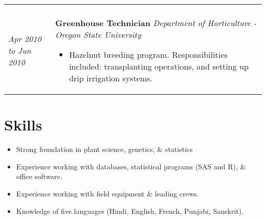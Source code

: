 ﻿\documentclass[a4paper]{article}
\begin{document}
\begin{tabular}{p{3cm} p{14cm}}
\begin{itemize}[noitemsep,topsep=0pt]
\end{itemize}
%
\\
%
\vspace{0pt} 
\textit{Apr 2010}\newline
\textit{to}\newline
\textit{Jun 2010}\newline
&
\vspace{0pt}
\textbf{Greenhouse Technician}\newline
\textit{Department of Horticulture - Oregon State University}
\begin{itemize}[noitemsep,topsep=0pt]
  \item Hazelnut breeding program. Responsibilities included: transplanting operations, and setting up drip irrigation systems.
\end{itemize}
\end{tabular}


\section*{Skills}
\begin{itemize}[noitemsep,topsep=0pt]
\item{Strong foundation in plant science, genetics, \& statistics}
\item{Experience working with databases, statistical programs (SAS and R), \& office software.}
\item{Experience working with field equipment \& leading crews.}
\item{Knowledge of five languages (Hindi, English, French, Punjabi, Sanskrit).}
\end{itemize}
\end{document}
